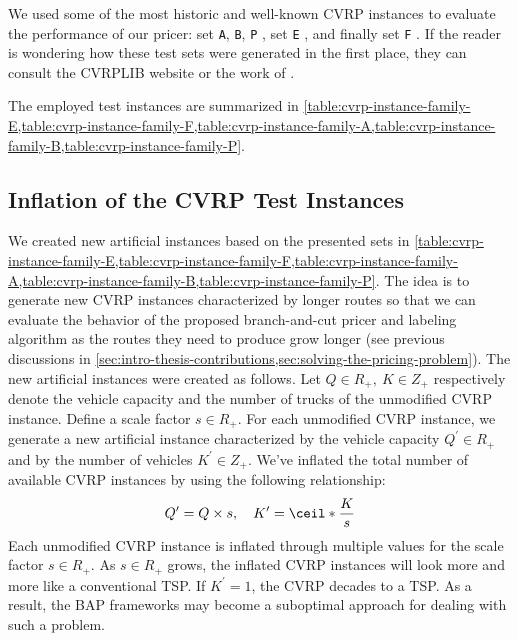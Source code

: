 \medskip

We used some of the most historic and well-known CVRP instances to evaluate the performance of our pricer:
set \texttt{A}, \texttt{B}, \texttt{P} \parencite{augerat1995},
set \texttt{E} \parencite{dantzig1959, christofides1969, gaskell1967bases, gillett1974heuristic},
and finally set \texttt{F} \parencite{fisher1994}.
If the reader is wondering how these test sets were generated in the first place,
they can consult the CVRPLIB website or the work of \textcite{uchoa2017}.

The employed test instances are summarized in
\cref{table:cvrp-instance-family-E,table:cvrp-instance-family-F,table:cvrp-instance-family-A,table:cvrp-instance-family-B,table:cvrp-instance-family-P}.



\subsection{Inflation of the CVRP Test Instances}
\label{sec:inflation-of-the-cvrp-test-instances}

We created new artificial instances based on the presented sets in
\cref{table:cvrp-instance-family-E,table:cvrp-instance-family-F,table:cvrp-instance-family-A,table:cvrp-instance-family-B,table:cvrp-instance-family-P}.
The idea is to generate new CVRP instances characterized by longer routes
so that we can evaluate the behavior of the proposed branch-and-cut pricer and labeling algorithm
as the routes they need to produce grow longer (see previous discussions in
\cref{sec:intro-thesis-contributions,sec:solving-the-pricing-problem}).
The new artificial instances were created as follows.
Let $Q \in R_+,\ K \in Z_+$ respectively denote the vehicle
capacity and the number of trucks of the unmodified CVRP instance.
Define a scale factor $s \in R_+$.
For each unmodified CVRP instance, we generate a new artificial instance
characterized by the vehicle capacity $Q^\prime \in R_+$
and by the number of vehicles $K^\prime \in Z_+$.
We've inflated the total number of available CVRP instances
by using the following relationship:
$$
	Q^\prime = Q \times s, \quad K^\prime = \ceil*{\frac{K}{s}}
$$
Each unmodified CVRP instance is inflated through multiple values for the scale factor $s \in R_+$.
As $s \in R_+$ grows, the inflated CVRP instances will look more and more like a conventional TSP.
If $K^\prime = 1$, the CVRP decades to a TSP. As a result, the BAP frameworks may become a suboptimal approach for dealing with such a problem.

